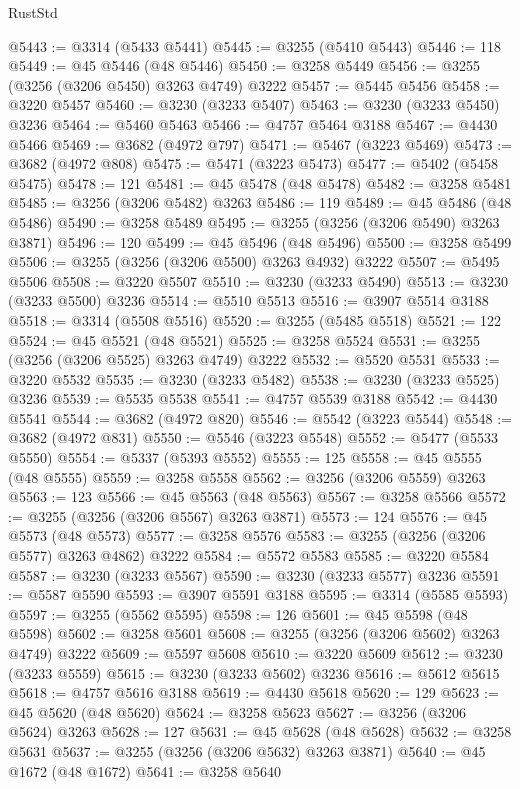 \begin{lexlean}{RustStd}
\begin{coremodule}
{\begin{coremodule}
{{{{{{{{{{{{{{{{{{{{{{{{{{{{{{{{{{{{{@5443 := @3314 (@5433 @5441)
@5445 := @3255 (@5410 @5443)
@5446 := 118
@5449 := @45 @5446 (@48 @5446)
@5450 := @3258 @5449
@5456 := @3255 (@3256 (@3206 @5450) @3263 @4749) @3222
@5457 := @5445 @5456
@5458 := @3220 @5457
@5460 := @3230 (@3233 @5407)
@5463 := @3230 (@3233 @5450) @3236
@5464 := @5460 @5463
@5466 := @4757 @5464 @3188
@5467 := @4430 @5466
@5469 := @3682 (@4972 @797)
@5471 := @5467 (@3223 @5469)
@5473 := @3682 (@4972 @808)
@5475 := @5471 (@3223 @5473)
@5477 := @5402 (@5458 @5475)
@5478 := 121
@5481 := @45 @5478 (@48 @5478)
@5482 := @3258 @5481
@5485 := @3256 (@3206 @5482) @3263
@5486 := 119
@5489 := @45 @5486 (@48 @5486)
@5490 := @3258 @5489
@5495 := @3255 (@3256 (@3206 @5490) @3263 @3871)
@5496 := 120
@5499 := @45 @5496 (@48 @5496)
@5500 := @3258 @5499
@5506 := @3255 (@3256 (@3206 @5500) @3263 @4932) @3222
@5507 := @5495 @5506
@5508 := @3220 @5507
@5510 := @3230 (@3233 @5490)
@5513 := @3230 (@3233 @5500) @3236
@5514 := @5510 @5513
@5516 := @3907 @5514 @3188
@5518 := @3314 (@5508 @5516)
@5520 := @3255 (@5485 @5518)
@5521 := 122
@5524 := @45 @5521 (@48 @5521)
@5525 := @3258 @5524
@5531 := @3255 (@3256 (@3206 @5525) @3263 @4749) @3222
@5532 := @5520 @5531
@5533 := @3220 @5532
@5535 := @3230 (@3233 @5482)
@5538 := @3230 (@3233 @5525) @3236
@5539 := @5535 @5538
@5541 := @4757 @5539 @3188
@5542 := @4430 @5541
@5544 := @3682 (@4972 @820)
@5546 := @5542 (@3223 @5544)
@5548 := @3682 (@4972 @831)
@5550 := @5546 (@3223 @5548)
@5552 := @5477 (@5533 @5550)
@5554 := @5337 (@5393 @5552)
@5555 := 125
@5558 := @45 @5555 (@48 @5555)
@5559 := @3258 @5558
@5562 := @3256 (@3206 @5559) @3263
@5563 := 123
@5566 := @45 @5563 (@48 @5563)
@5567 := @3258 @5566
@5572 := @3255 (@3256 (@3206 @5567) @3263 @3871)
@5573 := 124
@5576 := @45 @5573 (@48 @5573)
@5577 := @3258 @5576
@5583 := @3255 (@3256 (@3206 @5577) @3263 @4862) @3222
@5584 := @5572 @5583
@5585 := @3220 @5584
@5587 := @3230 (@3233 @5567)
@5590 := @3230 (@3233 @5577) @3236
@5591 := @5587 @5590
@5593 := @3907 @5591 @3188
@5595 := @3314 (@5585 @5593)
@5597 := @3255 (@5562 @5595)
@5598 := 126
@5601 := @45 @5598 (@48 @5598)
@5602 := @3258 @5601
@5608 := @3255 (@3256 (@3206 @5602) @3263 @4749) @3222
@5609 := @5597 @5608
@5610 := @3220 @5609
@5612 := @3230 (@3233 @5559)
@5615 := @3230 (@3233 @5602) @3236
@5616 := @5612 @5615
@5618 := @4757 @5616 @3188
@5619 := @4430 @5618
@5620 := 129
@5623 := @45 @5620 (@48 @5620)
@5624 := @3258 @5623
@5627 := @3256 (@3206 @5624) @3263
@5628 := 127
@5631 := @45 @5628 (@48 @5628)
@5632 := @3258 @5631
@5637 := @3255 (@3256 (@3206 @5632) @3263 @3871)
@5640 := @45 @1672 (@48 @1672)
@5641 := @3258 @5640
}}}}}}}}}}}}}}}}}}}}}}}}}}}}}}}}}}}}}
\end{coremodule}}
\end{coremodule}
\end{lexlean}
